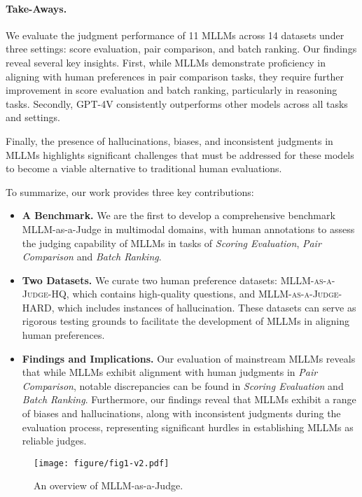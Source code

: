 \paragraph{Take-Aways.}
We evaluate the judgment performance of 11 MLLMs across 14 datasets under three settings: score evaluation, pair comparison, and batch ranking. Our findings reveal several key insights. First, while MLLMs demonstrate proficiency in aligning with human preferences in pair comparison tasks, they require further improvement in score evaluation and batch ranking, particularly in reasoning tasks. Secondly, GPT-4V consistently outperforms other models across all tasks and settings.

Finally, the presence of hallucinations, biases, and inconsistent judgments in MLLMs highlights significant challenges that must be addressed for these models to become a viable alternative to traditional human evaluations.

To summarize, our work provides three key contributions: 
\vspace{-5pt}
\begin{itemize}[nolistsep, leftmargin=*]
    \item \textbf{A Benchmark.}
    We are the first to develop a comprehensive benchmark MLLM-as-a-Judge in multimodal domains, with human annotations to assess the judging capability of MLLMs in tasks of \textit{Scoring Evaluation}, \textit{Pair Comparison} and \textit{Batch Ranking}. 
    \item \textbf{Two Datasets.}
    We curate two human preference datasets: \textsc{MLLM-as-a-Judge-HQ}, which contains high-quality questions, and \textsc{MLLM-as-a-Judge-HARD}, which includes instances of hallucination. These datasets can serve as rigorous testing grounds to facilitate the development of MLLMs in aligning human preferences.

    \item \textbf{Findings and Implications.}
    Our evaluation of mainstream MLLMs reveals that while MLLMs exhibit alignment with human judgments in \textit{Pair Comparison}, notable discrepancies can be found in \textit{Scoring Evaluation} and \textit{Batch Ranking}. Furthermore, our findings reveal that MLLMs exhibit a range of biases and hallucinations, along with inconsistent judgments during the evaluation process, representing significant hurdles in establishing MLLMs as reliable judges.

\end{itemize}

\begin{figure*}[t]
    \centering
    \texttt{[image: figure/fig1-v2.pdf]}
    \vspace{-8pt}
    \caption{An overview of {MLLM-as-a-Judge}.}
      \vspace{-8pt}
    \label{fig: pipeline}
\end{figure*}

